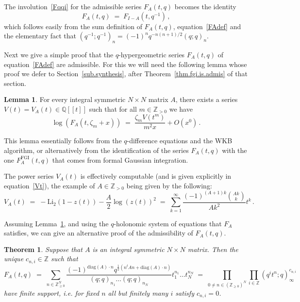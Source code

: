 \documentclass[12pt,reqno]{amsart}
\newcounter{theoremcount}
\newtheorem{theorem}[theoremcount]{Theorem}
\theoremstyle{definition}
\newtheorem{lemma}[proposition]{Lemma}
\def\BZ{\mathbb Z}
\def\BQ{\mathbb Q}
\def\Li{\mathrm{Li}}
\def\be{\begin{equation}}
\def\ee{\end{equation}}
\def\z{\zeta}
\def\={\;=\;}
\def\FGI{\mathrm{FGI}}
\begin{document}

The involution~\eqref{Fqqi} for the admissible series $F_A(t,q)$ becomes the
identity
\be
\label{FAqqi}
F_A(t,q) \= F_{I-A}(t,q^{-1})\,,
\ee
which follows easily from the sum definition of $F_A(t,q)$, equation~\eqref{FAdef}
and the elementary fact that $(q^{-1};q^{-1})_n = (-1)^n q^{-n(n+1)/2}(q;q)_n$. 

\medskip
Next we give a simple proof that the $q$-hypergeometric series
$F_A(t,q)$ of equation~\eqref{FAdef} are admissible. For this we will need the following
lemma whose proof we defer to Section~\ref{sub.synthesis}, after
Theorem~\ref{thm.fgi.is.admis} of that section.

\begin{lemma}
\label{Vlem}
For every integral symmetric $N \times N$ matrix $A$,   
there exists a series $V(t) = V_A(t)\in\BQ[\![t]\!]$ such that for all $m\in\BZ_{>0}$
we have
\be
\log(F_{A}(t,\z_m+x)) \= \frac{\z_mV(t^m)}{m^2x}+O(x^0)\,.
\ee
\end{lemma}

This lemma essentially follows from the $q$-difference equations and the WKB
algorithm, or alternatively from the identification of the series $F_A(t,q)$ with
the one $F_A^\FGI(t,q)$ that comes from formal Gaussian integration.

The power series $V_A(t)$ is effectively computable (and is given explicitly in
equation~\eqref{Vt}), the example of $A\in\BZ_{>0}$ being given by the following:
\be
V_{A}(t) \= -\Li_{2}(1-z(t)) -\frac{A}{2}\log(z(t))^2
\= \sum_{k=1}^{\infty} \frac{(-1)^{(A+1)k}\binom{Ak}{k}}{Ak^2} t^k\,.
\ee

Assuming Lemma~\ref{Vlem}, and using the $q$-holonomic system of equations
that $F_A$ satisfies, we can give an alternative proof of the admissibility of
$F_A(t,q)$. 

\begin{theorem}
\label{thm.DT}\cite{Efimov,KS:cohomological}
Suppose that $A$ is an integral symmetric $N \times N$ matrix. Then the unique
$c_{n,i}\in\BZ$ such that 
\be
F_{A}(t,q)
\= \sum_{n \in \BZ^N_{\ge0}} \frac{
(-1)^{\mathrm{diag}(A)\cdot n}
q^{\frac{1}{2}(n^t A n + \mathrm{diag}(A)\cdot n)} }{(q;q)_{n_1}
\dots (q;q)_{n_N}} t_1^{n_1} \dots t_N^{n_N}
\=
\prod_{0\neq n\in(\BZ_{\geq0})^N}
\prod_{i \in \BZ} (q^i t^{n};q)_\infty^{c_{n,i}}
\ee
have finite support, i.e. for fixed $n$ all but finitely many $i$ satisfy $c_{n,i}=0$.
\end{theorem}
\end{document}
